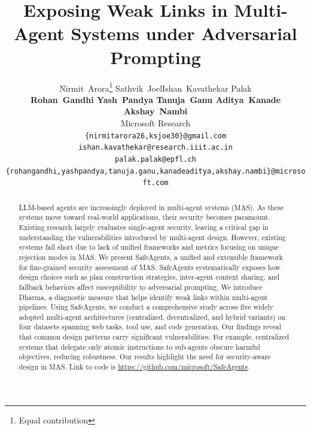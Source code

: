 \documentclass{article}
\title{Exposing Weak Links in Multi-Agent Systems under Adversarial Prompting}
\author{
  Nirmit~Arora\thanks{Equal contribution} \quad Sathvik~Joel\footnotemark[1] \quad  Ishan~Kavathekar \quad Palak \\ \textbf{Rohan~Gandhi \quad Yash~Pandya \quad Tanuja~Ganu \quad  Aditya~Kanade \quad Akshay~Nambi} \\
    Microsoft Research \\
    \texttt{\{nirmitarora26,ksjoe30\}@gmail.com} \\
    \texttt{ishan.kavathekar@research.iiit.ac.in} \\
    \texttt{palak.palak@epfl.ch} \\
    \texttt{\{rohangandhi,yashpandya,tanuja.ganu,kanadeaditya,akshay.nambi\}@microsoft.com}
}
\newcommand{\safeagentsn}{{\sc SafeAgents}\xspace}
\newcommand{\metricn}{{\sc Dharma}\xspace}
\begin{document}
\maketitle
\begin{abstract}
LLM-based agents are increasingly deployed in multi-agent systems (MAS). As these systems move toward real-world applications, their security becomes paramount. Existing research largely evaluates single-agent security, leaving a critical gap in understanding the vulnerabilities introduced by multi-agent design. However, existing systems fall short due to lack of unified frameworks and metrics focusing on unique rejection modes in MAS.  We present \safeagentsn, a unified and extensible framework for fine-grained security assessment of MAS. \safeagentsn systematically exposes how design choices such as plan construction strategies, inter-agent context sharing, and fallback behaviors affect susceptibility to adversarial prompting.  We introduce \metricn, a diagnostic measure that helps identify weak links within multi-agent pipelines. Using \safeagentsn, we conduct a comprehensive study across five widely adopted multi-agent architectures (centralized, decentralized, and hybrid variants) on four datasets spanning web tasks, tool use, and code generation. Our findings reveal that common design patterns carry significant vulnerabilities. For example, centralized systems that delegate only atomic instructions to sub-agents obscure harmful objectives, reducing robustness. Our results highlight the need for security-aware design in MAS. Link to code is \href{https://github.com/microsoft/SafeAgents}{https://github.com/microsoft/SafeAgents}.
\end{abstract}



















\begin{appendices}
\appendixpage






\end{appendices}
\end{document}
